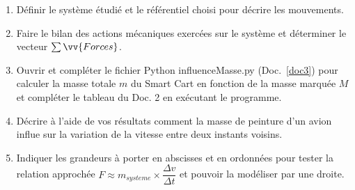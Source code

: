 \documentclass[a4paper,11pt,fleqn]{scrartcl}%
\begin{document}
    \begin{question}
        \begin{enumerate}
            \item Définir le système étudié et le référentiel choisi pour décrire les mouvements.
            \item Faire le bilan des actions mécaniques exercées sur le système et déterminer le vecteur $\sum \vv{Forces}$.
            \item Ouvrir et compléter le fichier Python influenceMasse.py (Doc.~\ref{doc3}) pour calculer la masse totale $m$ du Smart Cart en fonction de la masse marquée $M$ et compléter le tableau du Doc. 2 en exécutant le programme.
            \item Décrire à l'aide de vos résultats comment la masse de peinture d'un avion influe sur la variation de la vitesse entre deux instants voisins.
            \item Indiquer les grandeurs à porter en abscisses et en ordonnées pour tester la relation approchée $F \approx m_{systeme} \times \dfrac{\Delta v}{\Delta t}$ et pouvoir la modéliser par une droite.
        \end{enumerate}
    \end{question}
\end{document}
